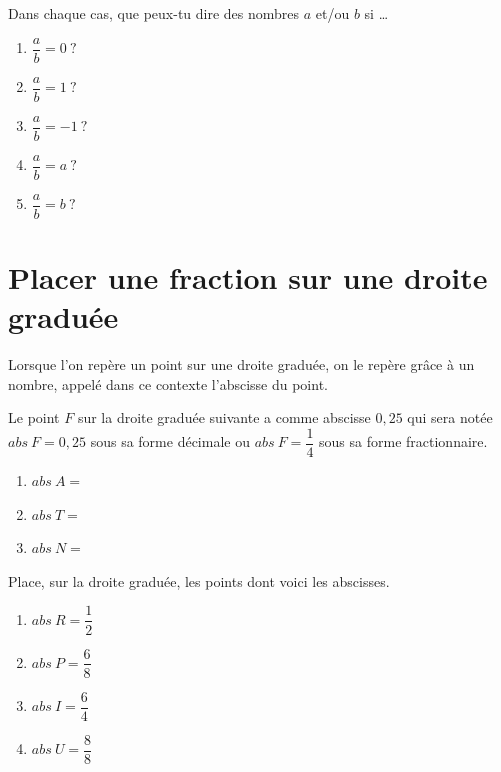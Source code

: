 \documentclass[../../syllabus_2.tex]{subfiles}
\begin{document}
\newpage
\begin{exercise}
  Dans chaque cas, que peux-tu dire des nombres $a$ et/ou $b$ si \dots
  \begin{enumerate}[itemsep=4em]
    \item $\dfrac{a}{b}=0 ~? $ \dotfill
    \item $\dfrac{a}{b}=1 ~?$ \dotfill
    \item $\dfrac{a}{b}=-1 ~?$ \dotfill
    \item $\dfrac{a}{b}=a ~?$ \dotfill
    \item $\dfrac{a}{b}=b ~?$ \dotfill
  \end{enumerate}
\end{exercise}

\section{Placer une fraction sur une droite graduée}

Lorsque l'on repère un point sur une droite graduée, on le repère grâce à un nombre, appelé dans ce contexte l'abscisse du point.

\exemple Le point $F$ sur la droite graduée suivante a comme abscisse $0,25$ qui sera notée $abs~F = 0,25$ sous sa forme décimale ou $abs~F=\dfrac{1}{4}$ sous sa forme fractionnaire.
\begin{center}
  
\end{center}

  \begin{enumerate}[cols=3]
    \item $abs~A=$
    \item $abs~T=$
    \item $abs~N=$
  \end{enumerate}


\begin{exercise}
  Place, sur la droite graduée, les points dont voici les abscisses.
  \begin{enumerate}[cols=4]
    \item $abs~R = \dfrac{1}{2}$
    \item $abs~P = \dfrac{6}{8}$
    \item $abs~I = \dfrac{6}{4}$
    \item $abs~U = \dfrac{8}{8}$
  \end{enumerate}
  \begin{center}
    
  \end{center}
\end{exercise}
\end{document}
